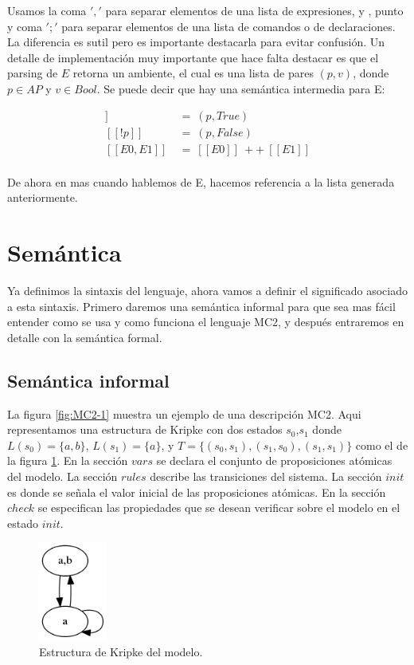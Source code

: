 Usamos la coma $','$ para separar elementos de una lista de expresiones, y , punto y coma $';'$ para separar elementos de una lista de comandos o de declaraciones. La diferencia es sutil pero es importante destacarla para evitar confusión.
Un detalle de implementación muy importante que hace falta destacar es que el parsing de $E$ retorna un ambiente, el cual es una lista de pares $(p,v)$, donde $p \in AP$ y $v \in Bool$. Se puede decir que hay una semántica intermedia para E:

\begin{align*}
[[p]]\ &=\ (p,True)\\
[[!p]]\ &=\ (p,False) \\
[[E0,E1]]\ &=\ [[E0]]\ ++\ [[E1]] \\
\end{align*}

De ahora en mas cuando hablemos de E, hacemos referencia a la lista generada anteriormente.

\section{Semántica}

Ya definimos la sintaxis del lenguaje, ahora vamos a definir el significado asociado a esta sintaxis. Primero daremos una semántica informal para que sea mas fácil entender como se usa y como funciona el lenguaje MC2, y después entraremos en detalle con la semántica formal.

\subsection{Semántica informal}

La figura \ref{fig:MC2-1} muestra un ejemplo de una descripción MC2. Aqui representamos una estructura de Kripke con dos estados $s_{0}$,$s_{1}$ donde $L(s_{0}) = \{a,b\}$, $L(s_{1}) = \{a\}$, y $T = \{(s_{0},s_{1}),(s_{1},s_{0}),(s_{1},s_{1})\}$ como el de la figura \ref{fig:kripke4}. En la sección $vars$ se declara el conjunto de proposiciones atómicas del modelo. La sección $rules$ describe las transiciones del sistema. La sección $init$ es donde se señala el valor inicial de las proposiciones atómicas. En la sección $check$ se especifican las propiedades que se desean verificar sobre el modelo en el estado $init$.

\begin{figure}[H]
  \centering
  \includegraphics[width=0.2\textwidth]{Figures/kripke4.png}
  \caption{Estructura de Kripke del modelo.}
  \label{fig:kripke4}
\end{figure}

